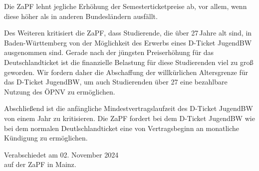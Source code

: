 \documentclass[DIV=calc]{scrartcl}
\begin{document}
Die ZaPF lehnt jegliche Erhöhung der Semesterticketpreise ab, vor allem, wenn diese höher als in anderen Bundesländern ausfällt.

Des Weiteren kritisiert die ZaPF, dass Studierende, die über 27\,Jahre alt sind, in Baden-Württemberg von der Möglichkeit des Erwerbs eines D-Ticket JugendBW ausgenommen sind. Gerade nach der jüngsten Preiserhöhung für das Deutschlandticket ist die finanzielle Belastung für diese Studierenden viel zu groß geworden. Wir fordern daher die Abschaffung der willkürlichen Altersgrenze für das D-Ticket JugendBW, um auch Studierenden über 27 eine bezahlbare Nutzung des ÖPNV zu ermöglichen.

Abschließend ist die anfängliche Mindestvertragslaufzeit des D-Ticket JugendBW von einem Jahr zu kritisieren. Die ZaPF fordert bei dem D-Ticket JugendBW wie bei dem normalen Deutlschlandticket eine von Vertragsbeginn an monatliche Kündigung zu ermöglichen.


%
\vfill
\begin{flushright}
	Verabschiedet am 02. November 2024 \\
	auf der ZaPF in Mainz.
\end{flushright}
\end{document}
